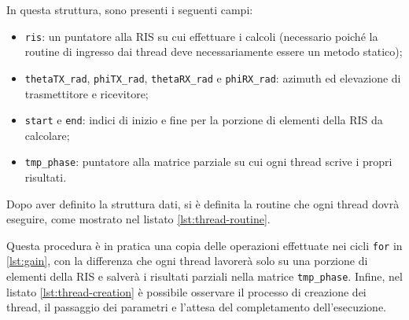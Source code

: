 \vspace{1em}

\vspace{1em}

In questa struttura, sono presenti i seguenti campi:

\begin{itemize}
  \item \texttt{ris}: un puntatore alla RIS su cui effettuare i calcoli (necessario
    poiché la routine di ingresso dai thread deve necessariamente essere un
    metodo statico);

  \item \texttt{thetaTX\_rad}, \texttt{phiTX\_rad}, \texttt{thetaRX\_rad} e
    \texttt{phiRX\_rad}: azimuth ed elevazione di trasmettitore e ricevitore;

  \item \texttt{start} e \texttt{end}: indici di inizio e fine per la porzione
    di elementi della RIS da calcolare;

  \item \texttt{tmp\_phase}: puntatore alla matrice parziale su cui ogni thread scrive
    i propri risultati.
\end{itemize}

Dopo aver definito la struttura dati, si è definita la routine che ogni thread dovrà
eseguire, come mostrato nel listato \ref{lst:thread-routine}.

\vspace{1em}

\vspace{1em}

Questa procedura è in pratica una copia delle operazioni effettuate nei cicli \texttt{for}
in \ref{lst:gain}, con la differenza che ogni thread lavorerà solo su una porzione
di elementi della RIS e salverà i risultati parziali nella matrice \texttt{tmp\_phase}.
Infine, nel listato \ref{lst:thread-creation} è possibile osservare il processo
di creazione dei thread, il passaggio dei parametri e l'attesa del completamento
dell'esecuzione.

\vspace{1em}


